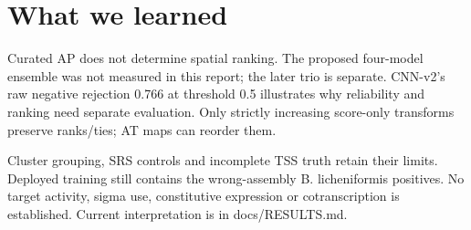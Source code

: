 \documentclass{article}
\begin{document}
\section{What we learned}
Curated AP does not determine spatial ranking. The proposed four-model ensemble was not measured in this report; the later trio is separate. CNN-v2's raw negative rejection 0.766 at threshold 0.5 illustrates why reliability and ranking need separate evaluation. Only strictly increasing score-only transforms preserve ranks/ties; AT maps can reorder them.

Cluster grouping, SRS controls and incomplete TSS truth retain their limits. Deployed training still contains the wrong-assembly B. licheniformis positives. No target activity, sigma use, constitutive expression or cotranscription is established. Current interpretation is in docs/RESULTS.md.
\end{document}
